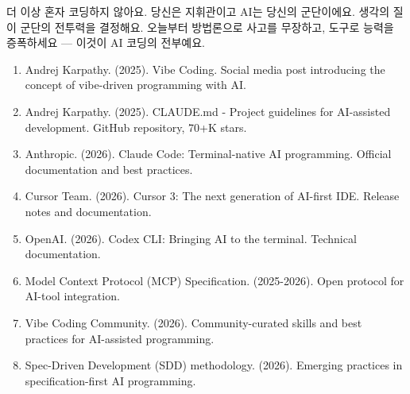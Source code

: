 더 이상 혼자 코딩하지 않아요. 당신은 지휘관이고 AI는 당신의 군단이에요. 생각의 질이 군단의 전투력을 결정해요. 오늘부터 방법론으로 사고를 무장하고, 도구로 능력을 증폭하세요 — 이것이 AI 코딩의 전부예요.


\begin{enumerate}
  \item Andrej Karpathy. (2025). Vibe Coding. Social media post introducing the concept of vibe-driven programming with AI.
  \item Andrej Karpathy. (2025). CLAUDE.md - Project guidelines for AI-assisted development. GitHub repository, 70+K stars.
  \item Anthropic. (2026). Claude Code: Terminal-native AI programming. Official documentation and best practices.
  \item Cursor Team. (2026). Cursor 3: The next generation of AI-first IDE. Release notes and documentation.
  \item OpenAI. (2026). Codex CLI: Bringing AI to the terminal. Technical documentation.
  \item Model Context Protocol (MCP) Specification. (2025-2026). Open protocol for AI-tool integration.
  \item Vibe Coding Community. (2026). Community-curated skills and best practices for AI-assisted programming.
  \item Spec-Driven Development (SDD) methodology. (2026). Emerging practices in specification-first AI programming.
\end{enumerate}
